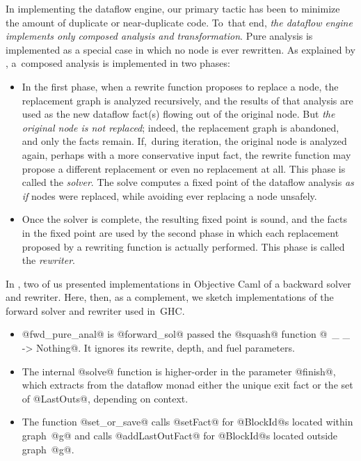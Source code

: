 \documentclass[blockstyle,preprint,nocopyrightspace]{sigplanconf}
\let\citeyear=\citeyearpar
\begin{document}
In implementing the dataflow engine, our primary tactic has been to
minimize the amount of duplicate or near-duplicate code.
To~that end, \emph{the dataflow engine implements only composed
analysis and transformation}.
Pure analysis is implemented as a special case in which no node is
ever rewritten.
As explained by \citet{lerner-grove-chambers:2002}, a~composed
analysis is implemented in two phases:
\begin{itemize}
\item
In the first phase, when a rewrite function proposes to replace a
node, the replacement graph is analyzed recursively, and the results
of that analysis are used as the new dataflow
fact(s) flowing out of the original node.
But \emph{the original node is not replaced}; indeed, the replacement
graph is abandoned, and only the facts remain.
If,~during iteration, the original node is analyzed again, perhaps
with a more conservative input fact, the rewrite function may propose
a different replacement or even no replacement at all.
This phase is called the \emph{solver}.
The solve computes a fixed point of the dataflow analysis
\emph{as if} nodes were replaced, while avoiding ever replacing a node
unsafely.
\item
Once the solver is complete, the resulting fixed point is sound,
and the facts in the fixed point are used by the second phase in which
each replacement proposed by a rewriting function is actually
performed.
This phase is called the \emph{rewriter}.
\end{itemize}

In \citeyear{ramsey-dias:applicative-flow-graph}, two of us
\citeauthor{ramsey-dias:applicative-flow-graph} presented
implementations in Objective Caml of a backward solver and rewriter.
Here, then, as a complement, we sketch implementations of the forward
solver and rewriter used in~GHC.


\begin{itemize}
\item
@fwd_pure_anal@ is @forward_sol@ passed the @squash@ function
@\ _ _ -> Nothing@.
It ignores its rewrite, depth, and fuel parameters.
\item
The internal @solve@ function is higher-order in the parameter
@finish@, which extracts from the dataflow monad either the unique
exit fact or the set of @LastOuts@, depending on context.
\item
The function @set_or_save@ calls @setFact@ for @BlockId@s located
within graph~@g@ and calls @addLastOutFact@ for @BlockId@s located
outside graph~@g@.
\end{itemize}
\end{document}
